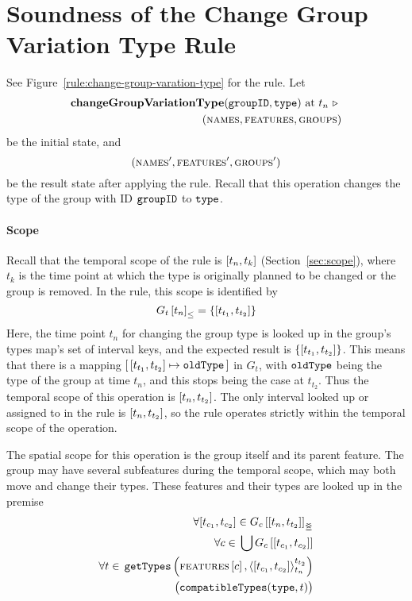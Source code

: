 \section{Soundness of the Change Group Variation Type Rule} 
\label{sec:soundness-of-the-change-group-variation-type-rule}

See Figure~\vref{rule:change-group-varation-type} for the  rule. Let 
\begin{equation*}
   \begin{split}
      \textbf{changeGroupVariationType}(\texttt{groupID}, \texttt{type}) \text{ at } t_n \ \triangleright \  \\
      (\textsc{names}, \textsc{features}, \textsc{groups}{})
   \end{split}
\end{equation*}
be the initial state, and
\[
   (\textsc{names}', \textsc{features}', \textsc{groups}{}')
\]
be the result state after applying the  rule. Recall that this operation changes the type of the group with ID $\texttt{groupID}$ to $\texttt{type}$.

\paragraph{Scope}
Recall that the temporal scope of the  rule is $\interval{t_n}{t_k}$ (Section~\vref{sec:scope}), where $t_k$ is the time point at which the type is originally planned to be changed or the group is removed. In the rule, this scope is identified by 
   \[
      \containing{G_t}{t_n} = \set{\interval{t_{t_1}}{t_{t_2}}}
   \]
   Here, the time point $t_n$ for changing the group type is looked up in the group's types map's set of interval keys, and the expected result is $\set{\interval{t_{t_1}}{t_{t_2}}}$. This means that there is a mapping $\intervalmapping{t_{t_1}}{t_{t_2}}{\var{oldType}}$ in $G_t$, with $\texttt{oldType}$ being the type of the group at time $t_n$, and this stops being the case at $t_{t_2}$. Thus the temporal scope of this operation is $\interval{t_n}{t_{t_2}}$. The only interval looked up or assigned to in the rule is $\interval{t_n}{t_{t_2}}$, so the rule operates strictly within the temporal scope of the operation.

   The spatial scope for this operation is the group itself and its parent feature. The group may have several subfeatures during the temporal scope, which may both move and change their types. These features and their types are looked up in the premise
\[
   \begin{split}
        \forall \interval{t_{c_1}}{t_{c_2}} \in \overlapping{G_c}{t_n}{t_{t_2}}\\ %
        \forall c \in \, \bigcup \lookup{G_c}{\interval{t_{c_1}}{t_{c_2}}}\\ %
        \forall t \in \, \var{getTypes}\left(\lookup{\features}{c}, \clamp{\interval{t_{c_1}}{t_{c_2}}}{t_n}{t_{t_2}}\right) \\ %
        \big(\var{compatibleTypes}(\var{type}, t)\big)
   \end{split}
\]

